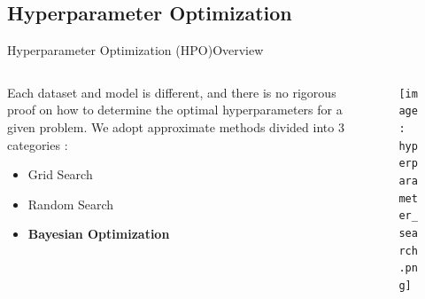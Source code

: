 \documentclass{beamer}
\begin{document}
        \subsection{Hyperparameter Optimization}

            \begin{frame}{Hyperparameter Optimization (HPO)}{Overview}
                \begin{columns}
                    \begin{column}{0.5\textwidth}
                        Each dataset and model is different, and there is no rigorous proof on how to determine the optimal hyperparameters for a given problem. We adopt approximate methods divided into 3 categories \cite{aws-hyperparameter}:
                        \begin{itemize}
                            \item Grid Search
                            \item Random Search
                            \item \textbf{Bayesian Optimization}
                        \end{itemize}
                    \end{column}
                    \begin{column}{0.5\textwidth}
                        \begin{figure}[!htbp]
                            \centering
                            \texttt{[image: hyperparameter\_search.png]}
                        \end{figure}
                    \end{column}
                \end{columns}
            \end{frame}
\end{document}
